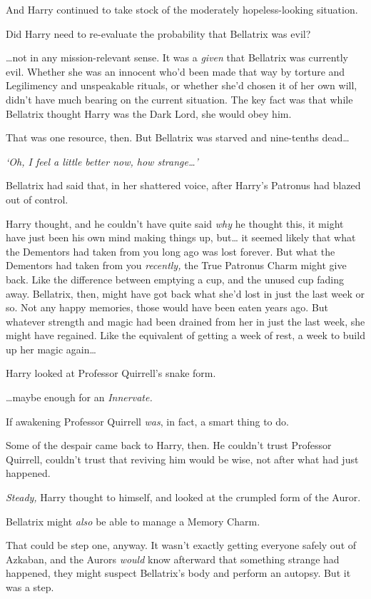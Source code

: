 And Harry continued to take stock of the moderately hopeless-looking
situation.

Did Harry need to re-evaluate the probability that Bellatrix was evil?

\ldots{}not in any mission-relevant sense. It was a \emph{given} that
Bellatrix was currently evil. Whether she was an innocent who'd been
made that way by torture and Legilimency and unspeakable rituals, or
whether she'd chosen it of her own will, didn't have much bearing on the
current situation. The key fact was that while Bellatrix thought Harry
was the Dark Lord, she would obey him.

That was one resource, then. But Bellatrix was starved and nine-tenths
dead\ldots{}

\emph{`Oh, I feel a little better now, how strange\ldots{}'}

Bellatrix had said that, in her shattered voice, after Harry's Patronus
had blazed out of control.

Harry thought, and he couldn't have quite said \emph{why} he thought
this, it might have just been his own mind making things up, but\ldots{}
it seemed likely that what the Dementors had taken from you long ago was
lost forever. But what the Dementors had taken from you \emph{recently,}
the True Patronus Charm might give back. Like the difference between
emptying a cup, and the unused cup fading away. Bellatrix, then, might
have got back what she'd lost in just the last week or so. Not any happy
memories, those would have been eaten years ago. But whatever strength
and magic had been drained from her in just the last week, she might
have regained. Like the equivalent of getting a week of rest, a week to
build up her magic again\ldots{}

Harry looked at Professor Quirrell's snake form.

\ldots{}maybe enough for an \emph{Innervate.}

If awakening Professor Quirrell \emph{was}, in fact, a smart thing to
do.

Some of the despair came back to Harry, then. He couldn't trust
Professor Quirrell, couldn't trust that reviving him would be wise, not
after what had just happened.

\emph{Steady,} Harry thought to himself, and looked at the crumpled form
of the Auror.

Bellatrix might \emph{also} be able to manage a Memory Charm.

That could be step one, anyway. It wasn't exactly getting everyone
safely out of Azkaban, and the Aurors \emph{would} know afterward that
something strange had happened, they might suspect Bellatrix's body and
perform an autopsy. But it was a step.

